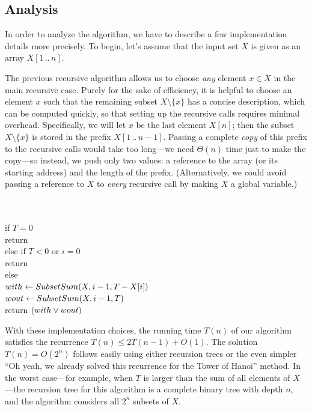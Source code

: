 \subsection{Analysis}

In order to analyze the algorithm, we have to describe a few implementation details more precisely.
To begin, let’s assume that the input set $X$ is given as an array $X[1\,..\,n]$.

The previous recursive algorithm allows us to choose \textit{any} element $x \in X$ in the main recursive case.
Purely for the sake of efficiency, it is helpful to choose an element $x$ such that the remaining subset $X \setminus \{x\}$ has a concise description, which can be computed quickly, so that setting up the recursive calls requires minimal overhead.
Specifically, we will let $x$ be the last element $X[n]$; then the subset $X \setminus \{x\}$ is stored in the prefix $X[1\,..\,n-1]$.
Passing a complete \textit{copy} of this prefix to the recursive calls would take too long---we need $\Theta(n)$ time just to make the copy---so instead, we push only two values: a reference to the array (or its starting address) and the length of the prefix.
(Alternatively, we could avoid passing a reference to $X$ to \textit{every} recursive call by making $X$ a global variable.)

\begin{pseudocode}
\\
\\
if $T = 0$\\
\Indent return \\
else if $T < 0$ or $i = 0$\\
\Indent return \\
else\\
\Indent $with \gets SubsetSum(X, i-1, T - X[i])$ \\
\Indent $wout \gets SubsetSum(X, i-1, T)$ \\
\Indent return $(with \vee wout)$
\end{pseudocode}

With these implementation choices, the running time $T(n)$ of our algorithm satisfies the recurrence $T(n) \le 2T(n-1) + O(1)$.
The solution $T(n) = O(2^n)$ follows easily using either recursion trees or the even simpler “Oh yeah, we already solved this recurrence for the Tower of Hanoi” method.
In the worst case---for example, when $T$ is larger than the sum of all elements of $X$---the recursion tree for this algorithm is a complete binary tree with depth $n$, and the algorithm considers all $2^n$ subsets of $X$.

